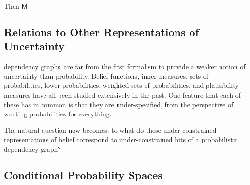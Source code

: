 \documentclass{article}
\newcommand{\sfM}{\mathsf M}
\newcommand{\modelname}{probabilistic dependency graph}
\newcommand{\modelnames}{\modelname s}
\numberwithin{equation}{section}
\begin{document}
\begin{notfocus}
\begin{example}
		\begin{figure}
			\centering
			\caption{}
			\label{fig:parallel}
		\end{figure}
		Then $\sfM$
		
	\end{example}

	
	
	\begin{vfull}
		\section{Relations to Other Representations of Uncertainty}
		\expandafter\expandafter\expandafter\MakeUppercase\modelnames\ are far from the first formalism to provide a weaker notion of uncertainty than probability. Belief functions, inner measures, sets of probabilities, lower probabilities, weighted sets of probabilities, and plausibility measures have all been studied extensively in the past. One feature that each of these has in common is that they are under-specified, from the perspective of wanting probabilities for everything.
		
		\begin{center}
		\end{center}
		
	
		The natural question now becomes: to what do these under-constrained representations of belief correspond to under-constrained bits of a \modelname?
		
		\subsection{Conditional Probability Spaces}
		
		\begin{center}
\end{center}
\end{vfull}
\end{notfocus}
\end{document}
